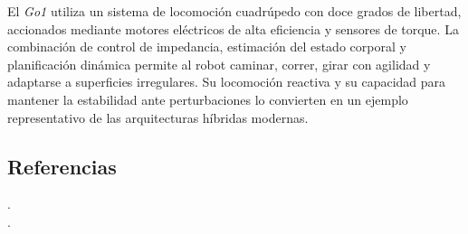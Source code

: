 El \textit{Go1} utiliza un sistema de locomoción cuadrúpedo con doce grados de libertad, accionados mediante motores eléctricos de alta eficiencia y sensores de torque. La combinación de control de impedancia, estimación del estado corporal y planificación dinámica permite al robot caminar, correr, girar con agilidad y adaptarse a superficies irregulares. Su locomoción reactiva y su capacidad para mantener la estabilidad ante perturbaciones lo convierten en un ejemplo representativo de las arquitecturas híbridas modernas. \\

\subsection*{Referencias}
\cite{UnitreeGo1} .\\
\cite{UnitreePaper} .